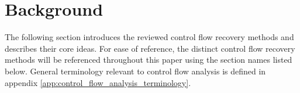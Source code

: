 
\section{Background}

The following section introduces the reviewed control flow recovery methods and describes their core ideas. For ease of reference, the distinct control flow recovery methods will be referenced throughout this paper using the section names listed below. General terminology relevant to control flow analysis is defined in appendix \ref{app:control_flow_analysis_terminology}.



\clearpage

\clearpage

%
